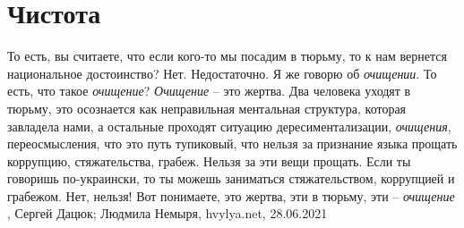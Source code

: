  
 
 
 
 
\chapter{Чистота}

То есть, вы считаете, что если кого-то мы посадим в тюрьму, то к нам вернется
национальное достоинство?  Нет. Недостаточно. Я же говорю об \emph{очищении}. То есть,
что такое \emph{очищение}? \emph{Очищение} – это жертва. Два человека уходят в тюрьму, это
осознается как неправильная ментальная структура, которая завладела нами, а
остальные проходят ситуацию дересиментализации, \emph{очищения}, переосмысления, что
это путь тупиковый, что нельзя за признание языка прощать коррупцию,
стяжательства, грабеж. Нельзя за эти вещи прощать. Если ты говоришь
по-украински, то ты можешь заниматься стяжательством, коррупцией и грабежом.
Нет, нельзя! Вот понимаете, это жертва, эти в тюрьму, эти – \emph{очищение}
, 
Сергей Дацюк; Людмила Немыря, hvylya.net, 28.06.2021

